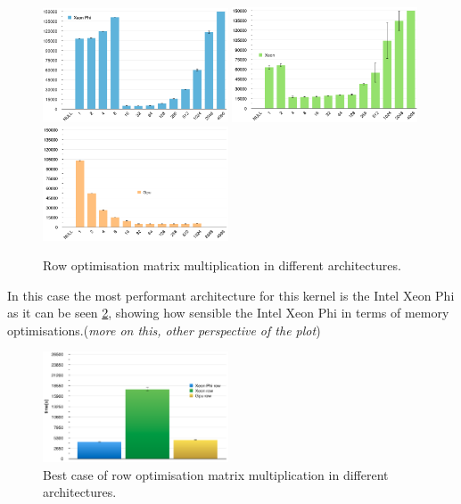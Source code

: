 \begin{figure}[!h]
    \centering
    \includegraphics[width=0.49\textwidth]{figures/opt2_phi.png}
    \includegraphics[width=0.49\textwidth]{figures/opt2_cpu.png}
    \includegraphics[width=0.49\textwidth]{figures/opt2_gpu.png}
    \caption{Row optimisation matrix multiplication in different architectures.}
    \label{Rows}
\end{figure}


\par{In this case the most performant architecture for this kernel is the Intel Xeon Phi as it can be seen \ref{RowRes}, 
    showing how sensible the Intel Xeon Phi in terms of memory optimisations.(\emph{more on this, other perspective of the plot})}

\begin{figure}[!h]
    \centering
    \includegraphics[width=0.49\textwidth]{figures/rowRes.png}
    \caption{Best case of row optimisation matrix multiplication in different architectures.}
    \label{RowRes}
\end{figure}



